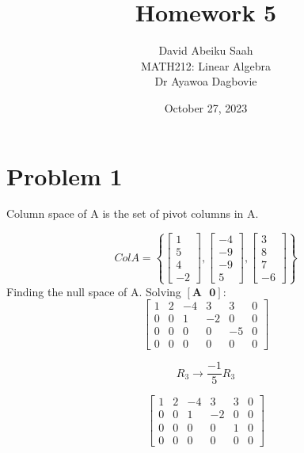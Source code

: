 \documentclass[12pt, a4paper]{article}
\title{
    \textbf{Homework 5} \\ \vspace{1cm}
}
\author{
\vspace*{0.5cm}
    David Abeiku Saah \\ \vspace{0.4cm}
    MATH212: Linear Algebra \\ \vspace{0.5cm}
    Dr Ayawoa Dagbovie \\
}
\date{October 27, 2023}
\begin{document}
\maketitle

\newpage

\section*{Problem 1}

Column space of A is the set of pivot columns in A.

\begin{equation*}
    Col A = \left\{
        \begin{bmatrix}
            1 \\
            5 \\
            4 \\
            -2
        \end{bmatrix}, \begin{bmatrix}
            -4 \\
            -9 \\
            -9 \\
            5
        \end{bmatrix}, \begin{bmatrix}
            3 \\
            8 \\
            7 \\
            -6
        \end{bmatrix}
    \right\}
\end{equation*}
Finding the null space of A. Solving $[\boldsymbol{A} \text{ } \boldsymbol{0}]$:\[
    \begin{bmatrix}
        1 & 2 & -4 & 3 & 3 & 0 \\
        0 & 0 & 1 & -2 & 0 & 0 \\
        0 & 0 & 0 & 0 & -5 & 0 \\
        0 & 0 & 0 & 0 & 0 & 0
    \end{bmatrix}
\]

\[
    R_3 \rightarrow \frac{-1}{5}R_3
\]

\[
    \begin{bmatrix}
        1 & 2 & -4 & 3 & 3 & 0 \\
        0 & 0 & 1 & -2 & 0 & 0 \\
        0 & 0 & 0 & 0 & 1 & 0\\
        0 & 0 & 0 & 0 & 0 & 0
    \end{bmatrix}
\]
\end{document}
